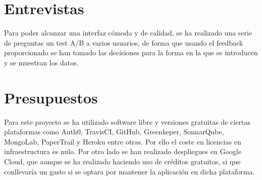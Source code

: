 \section {Entrevistas}
Para poder alcanzar una interfaz cómoda y de calidad, se ha realizado una serie de preguntas un test A/B a varios usuarios, de forma que usando el feedback proporcionado se han tomado las decisiones para la forma en la que se introducen y se muestran los datos.

\section {Presupuestos}

Para este proyecto se ha utilizado software libre y versiones gratuitas de ciertas plataformas como Auth0, TravisCI, GitHub, Greenkeper, SonnarQube, MongoLab, PaperTrail y Heroku entre otras. Por ello el coste en licencias en infraestructura es nulo. Por otro lado se han realizado despliegues en Google Cloud, que aunque se ha realizado haciendo uso de créditos gratuitos, si que conllevaría un gasto si se optara por mantener la aplicación en dicha plataforma.


